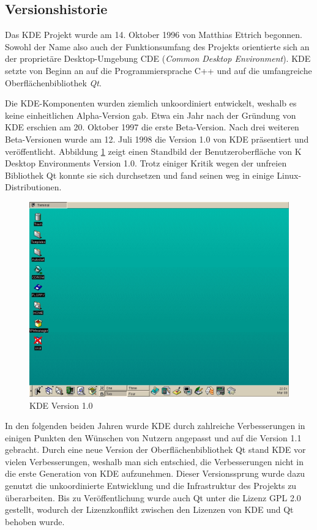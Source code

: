 \subsection{Versionshistorie}
Das KDE Projekt wurde am 14. Oktober 1996 von Matthias Ettrich begonnen. Sowohl der Name also auch der Funktionsumfang des Projekts orientierte sich an der proprietäre Desktop-Umgebung CDE (\textit{Common Desktop Environment}). KDE setzte von Beginn an auf die Programmiersprache C++ und auf die umfangreiche Oberflächenbibliothek \textit{Qt}.

Die KDE-Komponenten wurden ziemlich unkoordiniert entwickelt, weshalb es keine einheitlichen Alpha-Version gab. Etwa ein Jahr nach der Gründung von KDE erschien am 20. Oktober 1997 die erste Beta-Version. Nach drei weiteren Beta-Versionen wurde am 12. Juli 1998 die Version 1.0 von KDE präsentiert und veröffentlicht. Abbildung \ref{fig:kdeversion1} zeigt einen Standbild der Benutzeroberfläche von K Desktop Environments Version 1.0. Trotz einiger Kritik wegen der unfreien Bibliothek Qt konnte sie sich durchsetzen und fand seinen weg in einige Linux-Distributionen. \cite{kdeversion1}

\begin{figure}[h]
	\centering
	\includegraphics[width=\linewidth]{images/KDE_1.png}
	\caption{KDE Version 1.0 \cite{kdeversionenwiki}}
	\label{fig:kdeversion1}
\end{figure}

In den folgenden beiden Jahren wurde KDE durch zahlreiche Verbesserungen in einigen Punkten den Wünschen von Nutzern angepasst und auf die Version 1.1 gebracht. Durch eine neue Version der Oberflächenbibliothek Qt stand KDE vor vielen Verbesserungen, weshalb man sich entschied, die Verbesserungen nicht in die erste Generation von KDE aufzunehmen. Dieser Versionssprung wurde dazu genutzt die unkoordinierte Entwicklung und die Infrastruktur des Projekts zu überarbeiten. Bis zu Veröffentlichung wurde auch Qt unter die Lizenz GPL 2.0 gestellt, wodurch der Lizenzkonflikt zwischen den Lizenzen von KDE und Qt behoben wurde.

